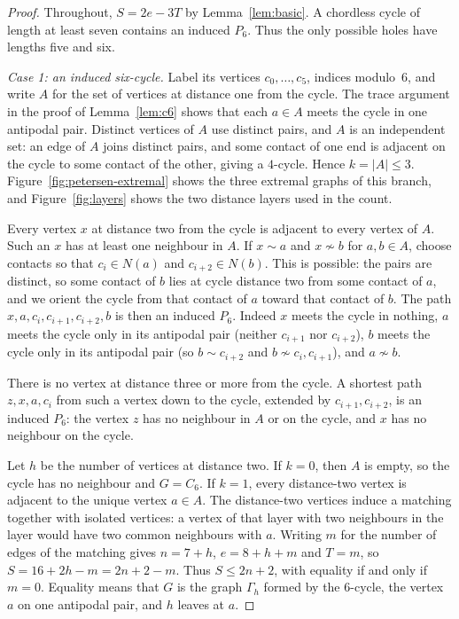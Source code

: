 \documentclass[ASNA]{USG}
\theoremstyle{WBstyletwo}
\numberwithin{equation}{section}
\begin{document}
\begin{proof}
Throughout, $S=2e-3T$ by Lemma~\ref{lem:basic}. A chordless cycle of length at least seven contains an induced $P_6$. Thus the only possible holes have lengths five and six.

\emph{Case 1: an induced six-cycle.}
Label its vertices $c_0,\dots,c_5$, indices modulo~$6$, and write $A$ for the set of vertices at distance one from the cycle. The trace argument in the proof of Lemma~\ref{lem:c6} shows that each $a\in A$ meets the cycle in one antipodal pair. Distinct vertices of $A$ use distinct pairs, and $A$ is an independent set: an edge of $A$ joins distinct pairs, and some contact of one end is adjacent on the cycle to some contact of the other, giving a $4$-cycle. Hence $k=|A|\le 3$. Figure~\ref{fig:petersen-extremal} shows the three extremal graphs of this branch, and Figure~\ref{fig:layers} shows the two distance layers used in the count.

Every vertex $x$ at distance two from the cycle is adjacent to every vertex of $A$. Such an $x$ has at least one neighbour in $A$. If $x\sim a$ and $x\not\sim b$ for $a,b\in A$, choose contacts so that $c_i\in N(a)$ and $c_{i+2}\in N(b)$. This is possible: the pairs are distinct, so some contact of $b$ lies at cycle distance two from some contact of $a$, and we orient the cycle from that contact of $a$ toward that contact of $b$. The path $x,a,c_i,c_{i+1},c_{i+2},b$ is then an induced $P_6$. Indeed $x$ meets the cycle in nothing, $a$ meets the cycle only in its antipodal pair (neither $c_{i+1}$ nor $c_{i+2}$), $b$ meets the cycle only in its antipodal pair (so $b\sim c_{i+2}$ and $b\not\sim c_i,c_{i+1}$), and $a\not\sim b$.

There is no vertex at distance three or more from the cycle. A shortest path $z,x,a,c_i$ from such a vertex down to the cycle, extended by $c_{i+1},c_{i+2}$, is an induced $P_6$: the vertex $z$ has no neighbour in $A$ or on the cycle, and $x$ has no neighbour on the cycle.

Let $h$ be the number of vertices at distance two. If $k=0$, then $A$ is empty, so the cycle has no neighbour and $G=C_6$. If $k=1$, every distance-two vertex is adjacent to the unique vertex $a\in A$. The distance-two vertices induce a matching together with isolated vertices: a vertex of that layer with two neighbours in the layer would have two common neighbours with $a$. Writing $m$ for the number of edges of the matching gives $n=7+h$, $e=8+h+m$ and $T=m$, so $S=16+2h-m=2n+2-m$. Thus $S\le 2n+2$, with equality if and only if $m=0$. Equality means that $G$ is the graph $\Gamma_h$ formed by the $6$-cycle, the vertex $a$ on one antipodal pair, and $h$ leaves at $a$.


\end{proof}
\end{document}
